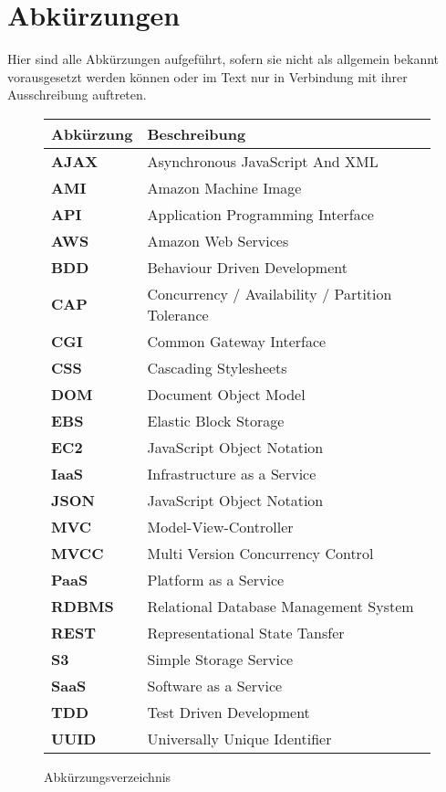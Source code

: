 \section{Abkürzungen}

Hier sind alle Abkürzungen aufgeführt, sofern sie nicht als allgemein bekannt vorausgesetzt werden können oder im Text nur in Verbindung mit ihrer Ausschreibung auftreten.

\medskip
\begin{figure}[H]
  \begin{tabular}{ | l | l | }
    \hline
    \textbf{Abkürzung} & \textbf{Beschreibung} \\ 
    \hline\hline
    \textbf{AJAX} & Asynchronous JavaScript And XML \\ \hline
    \textbf{AMI} & Amazon Machine Image \\ \hline
    \textbf{API} & Application Programming Interface \\ \hline
    \textbf{AWS} & Amazon Web Services \\ \hline
    \textbf{BDD} & Behaviour Driven Development \\ \hline
    \textbf{CAP} & Concurrency / Availability / Partition Tolerance \\ \hline
    \textbf{CGI} & Common Gateway Interface \\ \hline
    \textbf{CSS} & Cascading Stylesheets \\ \hline
    \textbf{DOM} & Document Object Model \\ \hline
    \textbf{EBS} & Elastic Block Storage \\ \hline
    \textbf{EC2} & JavaScript Object Notation \\ \hline
    \textbf{IaaS} & Infrastructure as a Service \\ \hline
    \textbf{JSON} & JavaScript Object Notation \\ \hline
    \textbf{MVC} & Model-View-Controller \\ \hline
    \textbf{MVCC} & Multi Version Concurrency Control \\ \hline
    \textbf{PaaS} & Platform as a Service \\ \hline
    \textbf{RDBMS} & Relational Database Management System \\ \hline
    \textbf{REST} & Representational State Tansfer \\ \hline
    \textbf{S3} & Simple Storage Service \\ \hline
    \textbf{SaaS} & Software as a Service \\ \hline
    \textbf{TDD} & Test Driven Development \\ \hline
    \textbf{UUID} & Universally Unique Identifier \\ 
    \hline
  \end{tabular}
  \caption{Abkürzungsverzeichnis}
  \label{figure:abkuerzungen}
\end{figure}

